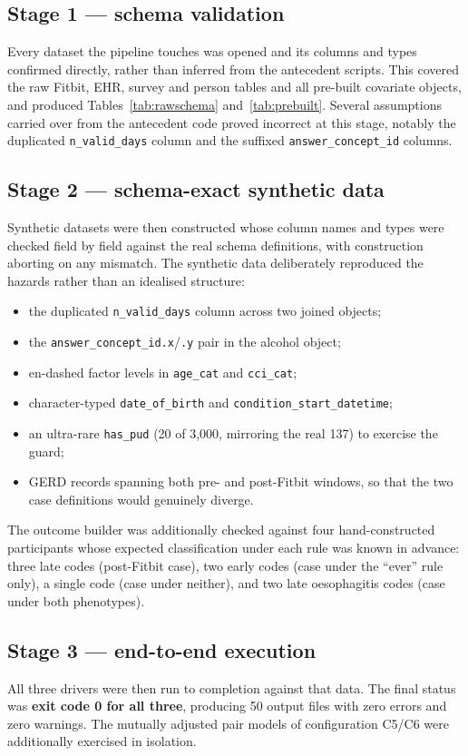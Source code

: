 \documentclass[11pt]{article}
\newcommand{\code}[1]{\texttt{\small #1}}
\begin{document}
\subsection{Stage 1 --- schema validation}
Every dataset the pipeline touches was opened and its columns and types confirmed directly, rather
than inferred from the antecedent scripts. This covered the raw Fitbit, EHR, survey and person tables
and all pre-built covariate objects, and produced Tables~\ref{tab:rawschema} and~\ref{tab:prebuilt}.
Several assumptions carried over from the antecedent code proved incorrect at this stage, notably the
duplicated \code{n_valid_days} column and the suffixed \code{answer_concept_id} columns.

\subsection{Stage 2 --- schema-exact synthetic data}
Synthetic datasets were then constructed whose column names and types were checked field by field
against the real schema definitions, with construction aborting on any mismatch. The synthetic data
deliberately reproduced the hazards rather than an idealised structure:
\begin{itemize}[leftmargin=1.4em,itemsep=1pt]
  \item the duplicated \code{n_valid_days} column across two joined objects;
  \item the \code{answer_concept_id.x}/\code{.y} pair in the alcohol object;
  \item en-dashed factor levels in \code{age_cat} and \code{cci_cat};
  \item character-typed \code{date_of_birth} and \code{condition_start_datetime};
  \item an ultra-rare \code{has_pud} (20 of 3,000, mirroring the real 137) to exercise the guard;
  \item GERD records spanning both pre- and post-Fitbit windows, so that the two case definitions
  would genuinely diverge.
\end{itemize}
The outcome builder was additionally checked against four hand-constructed participants whose
expected classification under each rule was known in advance: three late codes (post-Fitbit case), two
early codes (case under the ``ever'' rule only), a single code (case under neither), and two late
oesophagitis codes (case under both phenotypes).

\subsection{Stage 3 --- end-to-end execution}
All three drivers were then run to completion against that data. The final status was \textbf{exit
code 0 for all three}, producing 50 output files with zero errors and zero warnings. The mutually
adjusted pair models of configuration C5/C6 were additionally exercised in isolation.
\end{document}
